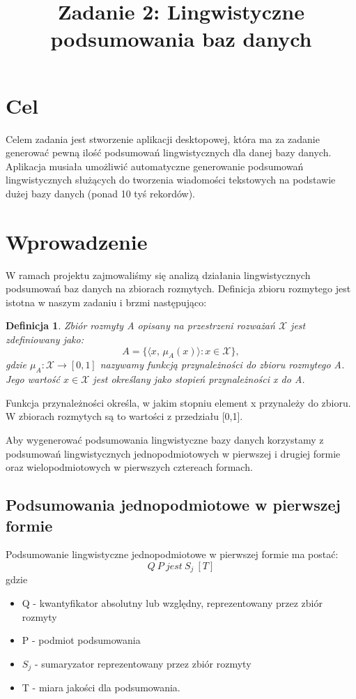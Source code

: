\documentclass{classrep}
\author{
	\studentinfo{Radosław Grela}{216769} \and
	\studentinfo{Jakub Wąchała}{216914} 
}
\title{Zadanie 2: Lingwistyczne podsumowania baz danych}
\newtheorem{defin}{Definicja}
\begin{document}
	\maketitle
	
	\section{Cel} %
	Celem zadania jest stworzenie aplikacji desktopowej, która ma za zadanie generować pewną ilość podsumowań lingwistycznych dla danej bazy danych. Aplikacja musiała umożliwić automatyczne generowanie podsumowań lingwistycznych służących do tworzenia wiadomości tekstowych na podstawie dużej bazy danych (ponad 10 tyś rekordów). \cite{tresc}
	
	\section{Wprowadzenie} %
	W ramach projektu zajmowaliśmy się analizą działania lingwistycznych podsumowań baz danych na zbiorach rozmytych. Definicja zbioru rozmytego jest istotna w naszym zadaniu i brzmi następująco:
	\begin{defin}
		\label{rozmyty}
		Zbiór rozmyty A opisany na przestrzeni rozważań $\mathcal{X}$ jest zdefiniowany jako:
		\begin{equation}
		A = \{\langle x,\, \mu_A(x)\rangle : x \in \mathcal{X} \}, 
		\end{equation}
		gdzie $\mu_A: \mathcal{X} \to [0,1]$ nazywamy funkcją przynależności do zbioru rozmytego A. Jego wartość $x \in \mathcal{X}$ jest określany jako stopień przynależności x do A. \cite{anbook}
	\end{defin}

	Funkcja przynależności określa, w jakim stopniu element x przynależy do zbioru. W zbiorach rozmytych są to wartości z przedziału [0,1]. 
	
	Aby wygenerować podsumowania lingwistyczne bazy danych korzystamy z podsumowań lingwistycznych jednopodmiotowych w pierwszej i drugiej formie oraz wielopodmiotowych w pierwszych cztereach formach.
	
	\subsection{Podsumowania jednopodmiotowe w pierwszej formie  \cite{anbook}}
	Podsumowanie lingwistyczne jednopodmiotowe w pierwszej formie ma postać:
	\begin{equation}
	Q\:P\:jest\:S_j\:[T]
	\end{equation}
	gdzie
	\begin{itemize}
		\item Q - kwantyfikator absolutny lub względny, reprezentowany przez zbiór rozmyty
		\item P - podmiot podsumowania
		\item $S_j$ - sumaryzator reprezentowany przez zbiór rozmyty
		\item T - miara jakości dla podsumowania.
	\end{itemize}
\end{document}
